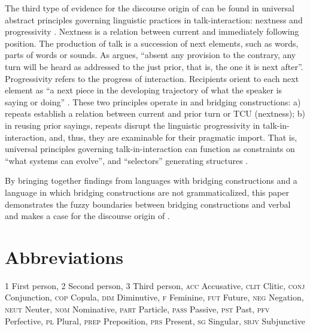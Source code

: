 \documentclass[output=paper]{LSP/langsci}
\begin{document}
The third type of evidence for the discourse origin of  can be found in universal abstract principles governing linguistic practices in talk-interaction: nextness and progressivity \citep{schegloff06}. Nextness is a relation between current and immediately following position. The production of talk is a succession of next elements, such as words, parts of words or sounds. As \citet[][86]{schegloff06} argues, ``absent any provision to the contrary, any turn will be heard as addressed to the just prior, that is, the one it is next after''. Progressivity refers to the  progress of interaction. Recipients orient to each next element as ``a next piece in the developing trajectory of what the speaker is saying or doing'' \citep[][86]{schegloff06}. These two principles operate in  and bridging constructions: a) repeats establish a relation between current and prior turn or TCU (nextness); b) in reusing prior sayings, repeats disrupt the linguistic progressivity in talk-in-interaction, and, thus, they are examinable for their pragmatic import. That is, universal principles governing talk-in-interaction can function as constraints on ``what systems can evolve'', and ``selectors'' generating structures \citep[][446]{evans.2009}.  

By bringing together findings from languages with bridging constructions and a language in which bridging constructions are not grammaticalized, this paper demonstrates the fuzzy boundaries between bridging constructions and verbal  and makes a case for the discourse origin of . 





\section*{ Abbreviations}

1      First person,
2      Second person,
3      Third person,
\textsc{acc}	Accusative,
\textsc{clit}	Clitic,
\textsc{conj}	Conjunction,
\textsc{cop}	Copula,
\textsc{dim}	Diminutive,
\textsc{f}	Feminine,
\textsc{fut}	Future,
\textsc{neg}	Negation,
\textsc{neut}	Neuter,
\textsc{nom}	Nominative,
\textsc{part}	Particle,
\textsc{pass}	Passive,
\textsc{pst}	Past,
\textsc{pfv}	Perfective,
\textsc{pl}	Plural,
\textsc{prep}	Preposition,
\textsc{prs}	Present,
\textsc{sg}	Singular,
\textsc{sbjv}	Subjunctive
\end{document}
